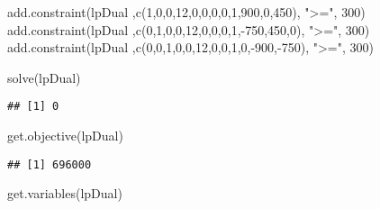 \documentclass[
]{article}
\newenvironment{Shaded}{\begin{snugshade}}{\end{snugshade}}
\newcommand{\DecValTok}[1]{\textcolor[rgb]{0.00,0.00,0.81}{#1}}
\newcommand{\FunctionTok}[1]{\textcolor[rgb]{0.00,0.00,0.00}{#1}}
\newcommand{\NormalTok}[1]{#1}
\newcommand{\SpecialCharTok}[1]{\textcolor[rgb]{0.00,0.00,0.00}{#1}}
\newcommand{\StringTok}[1]{\textcolor[rgb]{0.31,0.60,0.02}{#1}}
\begin{document}
\begin{Shaded}
\begin{Highlighting}[]
\FunctionTok{add.constraint}\NormalTok{(lpDual ,}\FunctionTok{c}\NormalTok{(}\DecValTok{1}\NormalTok{,}\DecValTok{0}\NormalTok{,}\DecValTok{0}\NormalTok{,}\DecValTok{12}\NormalTok{,}\DecValTok{0}\NormalTok{,}\DecValTok{0}\NormalTok{,}\DecValTok{0}\NormalTok{,}\DecValTok{0}\NormalTok{,}\DecValTok{1}\NormalTok{,}\DecValTok{900}\NormalTok{,}\DecValTok{0}\NormalTok{,}\DecValTok{450}\NormalTok{), }\StringTok{"\textgreater{}="}\NormalTok{, }\DecValTok{300}\NormalTok{)}
\FunctionTok{add.constraint}\NormalTok{(lpDual ,}\FunctionTok{c}\NormalTok{(}\DecValTok{0}\NormalTok{,}\DecValTok{1}\NormalTok{,}\DecValTok{0}\NormalTok{,}\DecValTok{0}\NormalTok{,}\DecValTok{12}\NormalTok{,}\DecValTok{0}\NormalTok{,}\DecValTok{0}\NormalTok{,}\DecValTok{0}\NormalTok{,}\DecValTok{1}\NormalTok{,}\SpecialCharTok{{-}}\DecValTok{750}\NormalTok{,}\DecValTok{450}\NormalTok{,}\DecValTok{0}\NormalTok{), }\StringTok{"\textgreater{}="}\NormalTok{, }\DecValTok{300}\NormalTok{)}
\FunctionTok{add.constraint}\NormalTok{(lpDual ,}\FunctionTok{c}\NormalTok{(}\DecValTok{0}\NormalTok{,}\DecValTok{0}\NormalTok{,}\DecValTok{1}\NormalTok{,}\DecValTok{0}\NormalTok{,}\DecValTok{0}\NormalTok{,}\DecValTok{12}\NormalTok{,}\DecValTok{0}\NormalTok{,}\DecValTok{0}\NormalTok{,}\DecValTok{1}\NormalTok{,}\DecValTok{0}\NormalTok{,}\SpecialCharTok{{-}}\DecValTok{900}\NormalTok{,}\SpecialCharTok{{-}}\DecValTok{750}\NormalTok{), }\StringTok{"\textgreater{}="}\NormalTok{, }\DecValTok{300}\NormalTok{)}


\FunctionTok{solve}\NormalTok{(lpDual)                     }
\end{Highlighting}
\end{Shaded}

\begin{verbatim}
## [1] 0
\end{verbatim}

\begin{Shaded}
\begin{Highlighting}[]
\FunctionTok{get.objective}\NormalTok{(lpDual)           }
\end{Highlighting}
\end{Shaded}

\begin{verbatim}
## [1] 696000
\end{verbatim}

\begin{Shaded}
\begin{Highlighting}[]
\FunctionTok{get.variables}\NormalTok{(lpDual)}
\end{Highlighting}
\end{Shaded}
\end{document}
